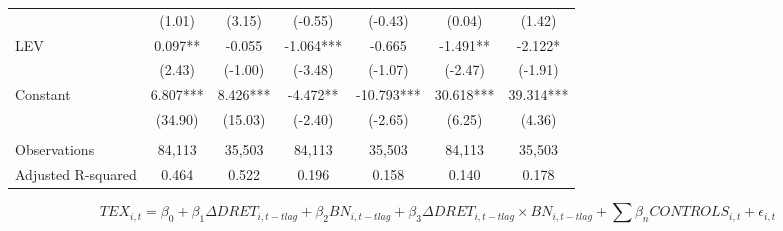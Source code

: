 \begin{table}[H]
\begin{center}
\begin{tabular}{lcccccc}
  		& (1.01) & \multicolumn{1}{c}{(3.15)} & (-0.55) & \multicolumn{1}{c}{(-0.43)} & (0.04) & \multicolumn{1}{c}{(1.42)} \\
  		LEV & 0.097** & \multicolumn{1}{c}{-0.055} & -1.064*** & \multicolumn{1}{c}{-0.665} & -1.491** & \multicolumn{1}{c}{-2.122*} \\
  		& (2.43) & \multicolumn{1}{c}{(-1.00)} & (-3.48) & \multicolumn{1}{c}{(-1.07)} & (-2.47) & \multicolumn{1}{c}{(-1.91)} \\
  		Constant & 6.807*** & \multicolumn{1}{c}{8.426***} & -4.472** & \multicolumn{1}{c}{-10.793***} & 30.618*** & \multicolumn{1}{c}{39.314***} \\
  		& (34.90) & \multicolumn{1}{c}{(15.03)} & (-2.40) & \multicolumn{1}{c}{(-2.65)} & (6.25) & \multicolumn{1}{c}{(4.36)} \\
  		&&&&&&\\
  		Observations & 84,113 & \multicolumn{1}{c}{35,503} & 84,113 & \multicolumn{1}{c}{35,503} & 84,113 & \multicolumn{1}{c}{35,503} \\
  		Adjusted R-squared & 0.464 & \multicolumn{1}{c}{0.522} & 0.196 & \multicolumn{1}{c}{0.158} & 0.140 & \multicolumn{1}{c}{0.178} \\
  		\bottomrule
  		\bottomrule
  	\end{tabular}%
  \end{center}
	\begin{footnotesize}
		\setcounter{equation}{1}
		\begin{equation}
			TEX_{i,t}=\beta_0+\beta_1\Delta DRET_{i,t-tlag}+\beta_2BN_{i,t-tlag}+\beta_3\Delta DRET_{i,t-tlag}\times BN_{i,t-tlag}+\sum\beta_nCONTROLS_{i,t}+\epsilon_{i,t}
		\end{equation}
		

\end{footnotesize}
\end{table}
